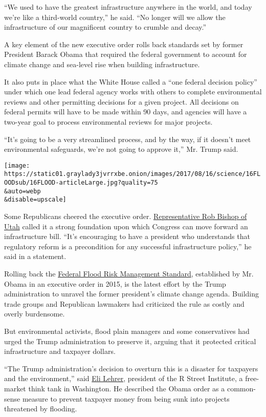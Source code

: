``We used to have the greatest infrastructure anywhere in the world, and
today we're like a third-world country,'' he said. ``No longer will we
allow the infrastructure of our magnificent country to crumble and
decay.''

A key element of the new executive order rolls back standards set by
former President Barack Obama that required the federal government to
account for climate change and sea-level rise when building
infrastructure.

It also puts in place what the White House called a ``one federal
decision policy'' under which one lead federal agency works with others
to complete environmental reviews and other permitting decisions for a
given project. All decisions on federal permits will have to be made
within 90 days, and agencies will have a two-year goal to process
environmental reviews for major projects.

``It's going to be a very streamlined process, and by the way, if it
doesn't meet environmental safeguards, we're not going to approve it,''
Mr. Trump said.

\texttt{[image: https://static01.graylady3jvrrxbe.onion/images/2017/08/16/science/16FLOODsub/16FLOOD-articleLarge.jpg?quality=75\\\&auto=webp\\\&disable=upscale]}

Some Republicans cheered the executive order.
\href{https://robbishop.house.gov/}{Representative Rob Bishop of Utah}
called it a strong foundation upon which Congress can move forward an
infrastructure bill. ``It's encouraging to have a president who
understands that regulatory reform is a precondition for any successful
infrastructure policy,'' he said in a statement.

Rolling back the
\href{https://obamawhitehouse.archives.gov/the-press-office/2015/01/30/executive-order-establishing-federal-flood-risk-management-standard-and-}{Federal
Flood Risk Management Standard}, established by Mr. Obama in an
executive order in 2015, is the latest effort by the Trump
administration to unravel the former president's climate change agenda.
Building trade groups and Republican lawmakers had criticized the rule
as costly and overly burdensome.

But environmental activists, flood plain managers and some conservatives
had urged the Trump administration to preserve it, arguing that it
protected critical infrastructure and taxpayer dollars.

``The Trump administration's decision to overturn this is a disaster for
taxpayers and the environment,'' said
\href{http://www.rstreet.org/people/eli-lehrer/}{Eli Lehrer}, president
of the R Street Institute, a free-market think tank in Washington. He
described the Obama order as a common-sense measure to prevent taxpayer
money from being sunk into projects threatened by flooding.

